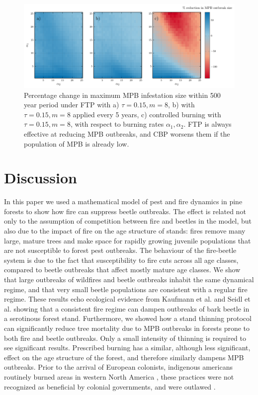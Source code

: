 \begin{figure}
  \includegraphics[width=\textwidth]{chapter_3/a1_a2_trim_gain.pdf}
  \caption{Percentage change in maximum MPB infestation size within 500 year period under FTP with a) $\tau = 0.15, m = 8$, b) with $\tau = 0.15, m = 8$ applied every 5 years, c) controlled burning with $\tau = 0.15, m = 8$,  with respect to burning rates $\alpha_1,\alpha_2$. FTP is always effective at reducing MPB outbreaks, and CBP worsens them if the population of MPB is already low.}
  \label{trim_gain}
\end{figure}
\section{Discussion}

In this paper we used a mathematical model of pest and fire dynamics in pine forests to show how fire can suppress beetle outbreaks. The effect is related not only to the assumption of competition between fire and beetles in the model, but also due to the impact of fire on the age structure of stands: fires remove many large, mature trees and make space for rapidly growing juvenile populations that are not susceptible to forest pest outbreaks. The behaviour of the fire-beetle system is due to the fact that susceptibility to fire cuts across all age classes, compared to beetle outbreaks that affect mostly mature age classes.  We show that large outbreaks of wildfires and beetle outbreaks inhabit the same dynamical regime, and that very small beetle populations are consistent with a regular fire regime.  These results echo ecological evidence from Kaufmann et al.\cite{kaufmann2008status} and Seidl et al.\cite{seidl2016spatial} showing that a consistent fire regime can dampen outbreaks of bark beetle in a serotinous forest stand.  Furthermore, we showed how a stand thinning protocol can significantly reduce tree mortality due to MPB outbreaks in forests prone to both fire and beetle outbreaks. Only a small intensity of thinning is required to see significant results. Prescribed burning has a similar, although less significant, effect on the age structure of the forest, and therefore similarly dampens MPB outbreaks. Prior to the arrival of European colonists, indigenous americans routinely burned areas in western North America \cite{barrett1982indian}, these practices were not recognized as beneficial by colonial governments, and were outlawed \cite{boyd1999indians}.

